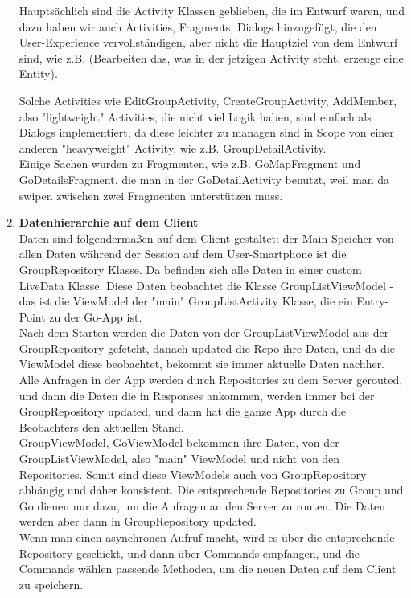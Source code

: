 \documentclass[11pt,a4paper]{scrartcl}
\begin{document}
\begin{enumerate}
Hauptsächlich sind die Activity Klassen geblieben, die im Entwurf waren, und dazu haben wir auch Activities, Fragments, Dialogs hinzugefügt, die den User-Experience vervollständigen, aber nicht die Hauptziel von dem Entwurf sind, wie z.B. (Bearbeiten das, was in der jetzigen Activity steht, erzeuge eine Entity).

Solche Activities wie EditGroupActivity, CreateGroupActivity, AddMember, also "lightweight" Activities, die nicht viel Logik haben, sind einfach als Dialogs implementiert, da diese leichter zu managen sind in Scope von einer anderen "heavyweight" Activity, wie z.B. GroupDetailActivity. \\

Einige Sachen wurden zu Fragmenten, wie z.B. GoMapFragment und GoDetailsFragment, die man in der GoDetailActivity benutzt, weil man da swipen zwischen zwei Fragmenten unterstützen muss.

\item \textbf{Datenhierarchie auf dem Client}\\

Daten sind folgendermaßen auf dem Client gestaltet: der Main Speicher von allen Daten während der Session auf dem User-Smartphone ist die GroupRepository Klasse. Da befinden sich alle Daten in einer custom LiveData Klasse. Diese Daten beobachtet die Klasse GroupListViewModel - das ist die ViewModel der "main" GroupListActivity Klasse, die ein Entry-Point zu der Go-App ist. \\

Nach dem Starten werden die Daten von der GroupListViewModel aus der GroupRepository gefetcht, danach updated die Repo ihre Daten, und da die ViewModel diese beobachtet, bekommt sie immer aktuelle Daten nachher. Alle Anfragen in der App werden durch Repositories zu dem Server gerouted, und dann die Daten die in Responses ankommen, werden immer bei der GroupRepository updated, und dann hat die ganze App durch die Beobachters den aktuellen Stand.\\

GroupViewModel, GoViewModel bekommen ihre Daten, von der GroupListViewModel, also "main" ViewModel und nicht von den Repositories. Somit sind diese ViewModels auch von GroupRepository abhängig und daher konsistent. Die entsprechende Repositories zu Group und Go dienen nur dazu, um die Anfragen an den Server zu routen. Die Daten werden aber dann in GroupRepository updated.\\

Wenn man einen asynchronen Aufruf macht, wird es über die entsprechende Repository geschickt, und dann über Commands empfangen, und die Commands wählen passende Methoden, um die neuen Daten auf dem Client zu speichern.\\


\end{enumerate}
\end{document}
